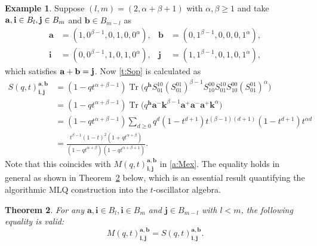 \documentclass[11pt]{article}
\newtheorem{theo}{Theorem}[section]
\theoremstyle{definition}
\newtheorem{exam}[theo]{Example}
\numberwithin{equation}{section}
\newcommand{\aaa}{\mathbf{a}}
\newcommand{\bb}{\mathbf{b}}
\newcommand{\hh}{\mathbf{h}}
\newcommand{\ii}{\mathbf{i}}
\newcommand{\jj}{\mathbf{j}}
\newcommand{\kk}{\mathbf{k}}
\DeclareMathOperator{\tr}{Tr}
\begin{document}
\begin{exam}\label{a:ex:S}
Suppose  $(l,m)=(2,\alpha+\beta+1)$ with $\alpha, \beta \ge 1$ and take
$\aaa, {\bf i} \in B_l, {\bf j} \in B_m$ and $\bb \in B_{m-l}$ as
\begin{align*}
\aaa & = (1,0^{\beta-1},0,1,0,0^\alpha),
&
\bb & = (0,1^{\beta-1},0,0,0,1^\alpha),
\\
\ii & = (0,0^{\beta-1},1,0,1,0^\alpha),
&
\jj &= (1,1^{\beta-1},0,1,0,1^\alpha),
\end{align*}
which satisfies $\aaa + \bb={\bf j}$. 
Now \eqref{t:Sop} is calculated as
\begin{align*}
S(q,t) _{\ii,\jj}^{\aaa,\bb}&= (1 - q t^{\alpha+\beta-1}) 
\tr \bigl(q^\hh S^{10}_{01}(S^{01}_{01})^{\beta-1} S^{00}_{10}
S^{10}_{01}S^{00}_{10}(S^{01}_{01})^\alpha \bigr)
\\
&= (1 - q t^{\alpha+\beta-1}) 
\tr \bigl(q^\hh \aaa^- \kk^{\beta-1} \aaa^+ \aaa^- \aaa^+ \kk^\alpha \bigr)
\\
&=(1 - q t^{\alpha+\beta-1}) \sum_{d\ge 0}q^d(1-t^{d+1})t^{(\beta-1)(d+1)}(1-t^{d+1})t^{\alpha d}
\\ & = \frac{t^{\beta-1}(1-t)^2(1+qt^{\alpha+\beta})}{(1-qt^{\alpha+\beta})(1-qt^{\alpha+\beta+1})}.
\end{align*}
Note that this coincides with  $M(q,t) _{\ii,\jj}^{\aaa,\bb}$ in \eqref{a:Mex}.
The equality holds in general as shown in Theorem~\ref{t:th:ms} below, which is 
an essential result quantifying the algorithmic MLQ construction into the $t$-oscillator algebra.
\end{exam}

\begin{theo}\label{t:th:ms}
For any $\aaa, \ii \in B_l, \ii \in B_m$ and $\jj \in B_{m-l}$ with $l<m$, the following equality is valid:
\begin{equation}
\label{t:ms}
M(q,t)_{\ii,\jj}^{\aaa,\bb} = S(q,t)_{\ii,\jj}^{\aaa,\bb}.
\end{equation}
\end{theo}
\end{document}
